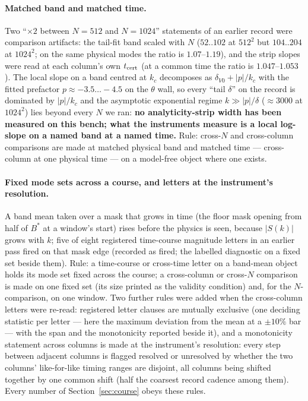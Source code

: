\documentclass[11pt,a4paper]{article}
\newcommand{\abs}[1]{\lvert #1 \rvert}
\newcommand{\tcert}{t_{\rm cert}}
\newcommand{\Bst}{B^*}
\begin{document}
\paragraph{Matched band and matched time.} Two ``$\times2$ between $N=512$ and $N=1024$'' statements of an earlier record were comparison artifacts: the tail-fit band scaled with $N$ ($52..102$ at $512^2$ but $104..204$ at $1024^2$; on the same physical modes the ratio is $1.07$--$1.19$), and the strip slopes were read at each column's own $\tcert$ (at a common time the ratio is $1.047$--$1.053$). The local slope on a band centred at $k_c$ decomposes as $\delta_{V0}+\abs p/k_c$ with the fitted prefactor $p\approx-3.5\dots-4.5$ on the $\theta$ wall, so every ``tail $\delta$'' on the record is dominated by $\abs p/k_c$ and the asymptotic exponential regime $k\gg\abs p/\delta$ ($\approx3000$ at $1024^2$) lies beyond every $N$ we ran: \textbf{no analyticity-strip width has been measured on this bench; what the instruments measure is a local log-slope on a named band at a named time.} Rule: cross-$N$ and cross-column comparisons are made at matched physical band and matched time --- cross-column at one physical time --- on a model-free object where one exists.

\paragraph{Fixed mode sets across a course, and letters at the instrument's resolution.} A band mean taken over a mask that grows in time (the floor mask opening from half of $\Bst$ at a window's start) rises before the physics is seen, because $\abs{S(k)}$ grows with $k$; five of eight registered time-course magnitude letters in an earlier pass fired on that mask edge (recorded as fired; the labelled diagnostic on a fixed set beside them). Rule: a time-course or cross-time letter on a band-mean object holds its mode set fixed across the course; a cross-column or cross-$N$ comparison is made on one fixed set (its size printed as the validity condition) and, for the $N$-comparison, on one window. Two further rules were added when the cross-column letters were re-read: registered letter clauses are mutually exclusive (one deciding statistic per letter --- here the maximum deviation from the mean at a $\pm10\%$ bar --- with the span and the monotonicity reported beside it), and a monotonicity statement across columns is made at the instrument's resolution: every step between adjacent columns is flagged resolved or unresolved by whether the two columns' like-for-like timing ranges are disjoint, all columns being shifted together by one common shift (half the coarsest record cadence among them). Every number of Section~\ref{sec:course} obeys these rules.
\end{document}
